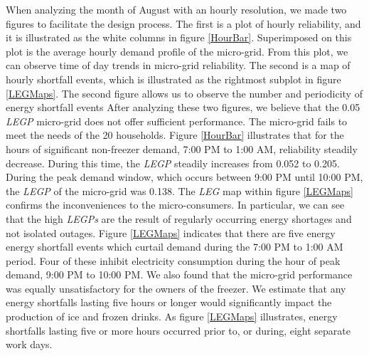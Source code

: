 \documentclass{article}
\begin{document}
When analyzing the month of August with an hourly resolution, we made two figures to facilitate the design process. 
The first is a plot of hourly reliability, and it is illustrated as the white columns in figure \ref{HourBar}. 
Superimposed on this plot is the average hourly demand profile of the micro-grid. 
From this plot, we can observe time of day trends in micro-grid reliability. 
The second is a map of hourly shortfall events, which is illustrated as the rightmost subplot in figure \ref{LEGMaps}.
The second figure allows us to observe the number and periodicity of energy shortfall events
After analyzing these two figures, we believe that the 0.05 \emph{LEGP} micro-grid does not offer sufficient performance.
The micro-grid fails to meet the needs of the 20 households.
Figure \ref{HourBar} illustrates that for the hours of significant non-freezer demand, 7:00 PM to 1:00 AM, reliability steadily decrease. 
During this time, the \emph{LEGP} steadily increases from 0.052 to 0.205. 
During the peak demand window, which occurs between 9:00 PM until 10:00 PM, the \emph{LEGP} of the micro-grid was 0.138.
The \emph{LEG} map within figure \ref{LEGMaps} confirms the inconveniences to the micro-consumers.
In particular, we can see that the high \emph{LEGPs} are the result of regularly occurring energy shortages and not isolated outages.
Figure \ref{LEGMaps} indicates that there are five energy energy shortfall events which curtail demand during the 7:00 PM to 1:00 AM period.
Four of these inhibit electricity consumption during the hour of peak demand, 9:00 PM to 10:00 PM.
We also found that the micro-grid performance was equally unsatisfactory for the owners of the freezer.
We estimate that any energy shortfalls lasting five hours or longer would significantly impact the production of ice and frozen drinks. 
As figure \ref{LEGMaps} illustrates, energy shortfalls lasting five or more hours occurred prior to, or during, eight separate work days.
 
\end{document}
